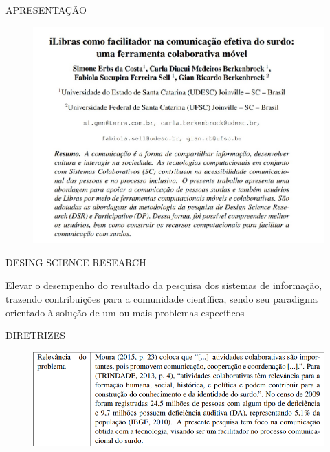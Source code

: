 \documentclass{Alexandre}
\begin{document}
\begin{frame}{APRESENTAÇÃO}

    \begin{figure}
        \includegraphics[scale = 0.3]{Figuras/iLibras.jpg}
    \end{figure}

\end{frame}


\begin{frame}{DESING SCIENCE RESEARCH}
    
    Elevar o desempenho do resultado da pesquisa dos sistemas de informação, trazendo contribuições para a comunidade científica, sendo seu paradigma orientado à solução de um ou mais problemas específicos

\end{frame}


\begin{frame}{DIRETRIZES}
    
    \begin{figure}
        \includegraphics[scale = 0.5]{Figuras/DSR-1.png}
    \end{figure}

\end{frame}
\end{document}
